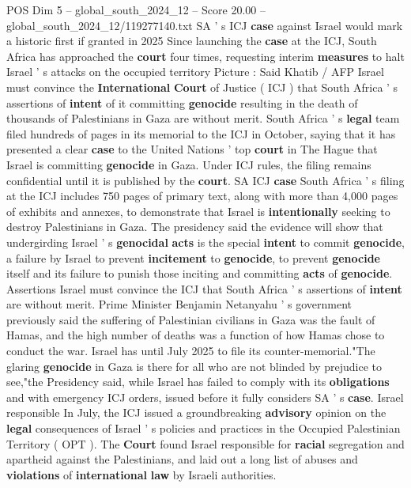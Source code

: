 \begin{textsample}{POS Dim 5 – global\_south\_2024\_12 – Score 20.00 – global\_south\_2024\_12/119277140.txt}  \label{ex:f5_pos_051}
SA ' s ICJ \textbf{case} against Israel would mark a historic first if granted in 2025 Since launching the \textbf{case} at the ICJ, South Africa has approached the \textbf{court} four times, requesting interim \textbf{measures} to halt Israel ' s attacks on the occupied territory Picture : Said Khatib / AFP Israel must convince the \textbf{International} \textbf{Court} of Justice ( ICJ ) that South Africa ' s assertions of \textbf{intent} of it committing \textbf{genocide} resulting in the death of thousands of Palestinians in Gaza are without merit.
South Africa ' s \textbf{legal} team filed hundreds of pages in its memorial to the ICJ in October, saying that it has presented a clear \textbf{case} to the United Nations ' top \textbf{court} in The Hague that Israel is committing \textbf{genocide} in Gaza.
Under ICJ rules, the filing remains confidential until it is published by the \textbf{court}.
SA ICJ \textbf{case} South Africa ' s filing at the ICJ includes 750 pages of primary text, along with more than 4,000 pages of exhibits and annexes, to demonstrate that Israel is \textbf{intentionally} seeking to destroy Palestinians in Gaza.
The presidency said the evidence will show that undergirding Israel ' s \textbf{genocidal} \textbf{acts} is the special \textbf{intent} to commit \textbf{genocide}, a failure by Israel to prevent \textbf{incitement} to \textbf{genocide}, to prevent \textbf{genocide} itself and its failure to punish those inciting and committing \textbf{acts} of \textbf{genocide}.
Assertions Israel must convince the ICJ that South Africa ' s assertions of \textbf{intent} are without merit.
Prime Minister Benjamin Netanyahu ' s government previously said the suffering of Palestinian civilians in Gaza was the fault of Hamas, and the high number of deaths was a function of how Hamas chose to conduct the war.
Israel has until July 2025 to file its counter-memorial."The glaring \textbf{genocide} in Gaza is there for all who are not blinded by prejudice to see,"the Presidency said, while Israel has failed to comply with its \textbf{obligations} and with emergency ICJ orders, issued before it fully considers SA ' s \textbf{case}.
Israel responsible In July, the ICJ issued a groundbreaking \textbf{advisory} opinion on the \textbf{legal} consequences of Israel ' s policies and practices in the Occupied Palestinian Territory ( OPT ).
The \textbf{Court} found Israel responsible for \textbf{racial} segregation and apartheid against the Palestinians, and laid out a long list of abuses and \textbf{violations} of \textbf{international} \textbf{law} by Israeli authorities.

\end{textsample}
